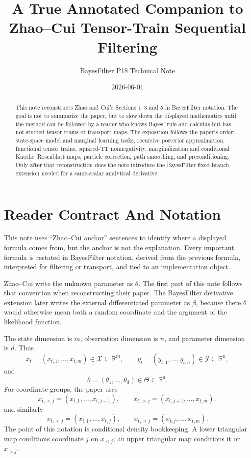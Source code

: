 \documentclass[11pt]{article}
\title{A True Annotated Companion to Zhao--Cui Tensor-Train Sequential Filtering}
\author{BayesFilter P18 Technical Note}
\date{2026-06-01}
\newcommand{\R}{\mathbb R}
\begin{document}
\maketitle

\begin{abstract}
This note reconstructs Zhao and Cui's Sections 1--3 and 5 in BayesFilter
notation.  The goal is not to summarize the paper, but to slow down the
displayed mathematics until the method can be followed by a reader who knows
Bayes' rule and calculus but has not studied tensor trains or transport maps.
The exposition follows the paper's order: state-space model and marginal
learning tasks, recursive posterior approximation, functional tensor trains,
squared-TT nonnegativity, marginalization and conditional
Knothe--Rosenblatt maps, particle correction, path smoothing, and
preconditioning.  Only after that reconstruction does the note introduce the
BayesFilter fixed-branch extension needed for a same-scalar analytical
derivative.
\end{abstract}

\tableofcontents

\section{Reader Contract And Notation}

This note uses ``Zhao--Cui anchor'' sentences to identify where a displayed
formula comes from, but the anchor is not the explanation.  Every important
formula is restated in BayesFilter notation, derived from the previous
formula, interpreted for filtering or transport, and tied to an implementation
object.

Zhao--Cui write the unknown parameter as \(\theta\).  The first part of this
note follows that convention when reconstructing their paper.  The
BayesFilter derivative extension later writes the external differentiated
parameter as \(\beta\), because there \(\theta\) would otherwise mean both a
random coordinate and the argument of the likelihood function.

The state dimension is \(m\), observation dimension is \(n\), and parameter
dimension is \(d\).  Thus
\[
    x_t=(x_{t,1},\ldots,x_{t,m})\in\mathcal X\subseteq\R^m,
    \qquad
    y_t=(y_{t,1},\ldots,y_{t,n})\in\mathcal Y\subseteq\R^n,
\]
and
\[
    \theta=(\theta_1,\ldots,\theta_d)\in\Theta\subseteq\R^d.
\]
For coordinate groups, the paper uses
\[
    x_{t,<j}=(x_{t,1},\ldots,x_{t,j-1}),\qquad
    x_{t,>j}=(x_{t,j+1},\ldots,x_{t,m}),
    \tag{N1}
\]
and similarly
\[
    x_{t,\le j}=(x_{t,1},\ldots,x_{t,j}),\qquad
    x_{t,\ge j}=(x_{t,j},\ldots,x_{t,m}).
    \tag{N2}
\]
The point of this notation is conditional density bookkeeping.  A lower
triangular map conditions coordinate \(j\) on \(x_{<j}\); an upper triangular
map conditions it on \(x_{>j}\).
\end{document}
